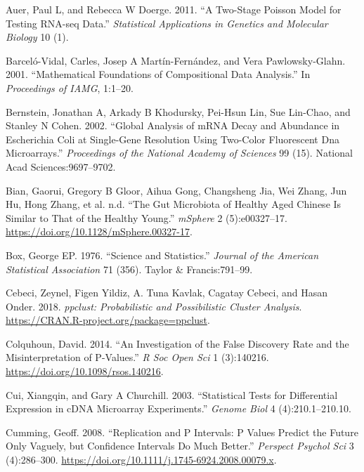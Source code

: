 \documentclass[onecolumn]{book}
\theoremstyle{definition}
\theoremstyle{definition}
\theoremstyle{definition}
\theoremstyle{remark}
\begin{document}
\leavevmode\hypertarget{ref-auer:2011}{}%
Auer, Paul L, and Rebecca W Doerge. 2011. ``A Two-Stage Poisson Model
for Testing RNA-seq Data.'' \emph{Statistical Applications in Genetics
and Molecular Biology} 10 (1).

\leavevmode\hypertarget{ref-barcelo:2001}{}%
Barceló-Vidal, Carles, Josep A Martín-Fernández, and Vera
Pawlowsky-Glahn. 2001. ``Mathematical Foundations of Compositional Data
Analysis.'' In \emph{Proceedings of IAMG}, 1:1--20.

\leavevmode\hypertarget{ref-mRNA:2002}{}%
Bernstein, Jonathan A, Arkady B Khodursky, Pei-Hsun Lin, Sue Lin-Chao,
and Stanley N Cohen. 2002. ``Global Analysis of mRNA Decay and Abundance
in Escherichia Coli at Single-Gene Resolution Using Two-Color
Fluorescent Dna Microarrays.'' \emph{Proceedings of the National Academy
of Sciences} 99 (15). National Acad Sciences:9697--9702.

\leavevmode\hypertarget{ref-bian:2017}{}%
Bian, Gaorui, Gregory B Gloor, Aihua Gong, Changsheng Jia, Wei Zhang,
Jun Hu, Hong Zhang, et al. n.d. ``The Gut Microbiota of Healthy Aged
Chinese Is Similar to That of the Healthy Young.'' \emph{mSphere} 2
(5):e00327--17. \url{https://doi.org/10.1128/mSphere.00327-17}.

\leavevmode\hypertarget{ref-box:1976}{}%
Box, George EP. 1976. ``Science and Statistics.'' \emph{Journal of the
American Statistical Association} 71 (356). Taylor \& Francis:791--99.

\leavevmode\hypertarget{ref-fuzzy:2018}{}%
Cebeci, Zeynel, Figen Yildiz, A. Tuna Kavlak, Cagatay Cebeci, and Hasan
Onder. 2018. \emph{ppclust: Probabilistic and Possibilistic Cluster
Analysis}. \url{https://CRAN.R-project.org/package=ppclust}.

\leavevmode\hypertarget{ref-Colquhoun:2014aa}{}%
Colquhoun, David. 2014. ``An Investigation of the False Discovery Rate
and the Misinterpretation of P-Values.'' \emph{R Soc Open Sci} 1
(3):140216. \url{https://doi.org/10.1098/rsos.140216}.

\leavevmode\hypertarget{ref-Cui:2003aa}{}%
Cui, Xiangqin, and Gary A Churchill. 2003. ``Statistical Tests for
Differential Expression in cDNA Microarray Experiments.'' \emph{Genome
Biol} 4 (4):210.1--210.10.

\leavevmode\hypertarget{ref-Cumming:2008aa}{}%
Cumming, Geoff. 2008. ``Replication and P Intervals: P Values Predict
the Future Only Vaguely, but Confidence Intervals Do Much Better.''
\emph{Perspect Psychol Sci} 3 (4):286--300.
\url{https://doi.org/10.1111/j.1745-6924.2008.00079.x}.
\end{document}
